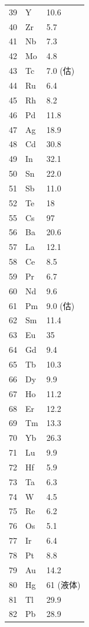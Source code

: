 \documentclass[12pt,a4paper]{article}
\begin{document}
\begin{longtable}{p{0.6cm}p{1.2cm}p{1.5cm}}
		39 & Y  & 10.6 \\
		40 & Zr & 5.7 \\
		41 & Nb & 7.3 \\
		42 & Mo & 4.8 \\
		43 & Tc & 7.0 (估) \\
		44 & Ru & 6.4 \\
		45 & Rh & 8.2 \\
		46 & Pd & 11.8 \\
		47 & Ag & 18.9 \\
		48 & Cd & 30.8 \\
		49 & In & 32.1 \\
		50 & Sn & 22.0 \\
		51 & Sb & 11.0 \\
		52 & Te & 18 \\
		55 & Cs & 97 \\
		56 & Ba & 20.6 \\
		57 & La & 12.1 \\
		58 & Ce & 8.5 \\
		59 & Pr & 6.7 \\
		60 & Nd & 9.6 \\
		61 & Pm & 9.0 (估) \\
		62 & Sm & 11.4 \\
		63 & Eu & 35 \\
		64 & Gd & 9.4 \\
		65 & Tb & 10.3 \\
		66 & Dy & 9.9 \\
		67 & Ho & 11.2 \\
		68 & Er & 12.2 \\
		69 & Tm & 13.3 \\
		70 & Yb & 26.3 \\
		71 & Lu & 9.9 \\
		72 & Hf & 5.9 \\
		73 & Ta & 6.3 \\
		74 & W  & 4.5 \\
		75 & Re & 6.2 \\
		76 & Os & 5.1 \\
		77 & Ir & 6.4 \\
		78 & Pt & 8.8 \\
		79 & Au & 14.2 \\
		80 & Hg & 61 (液体) \\
		81 & Tl & 29.9 \\
		82 & Pb & 28.9 \\
	\end{longtable}
	
\end{document}
